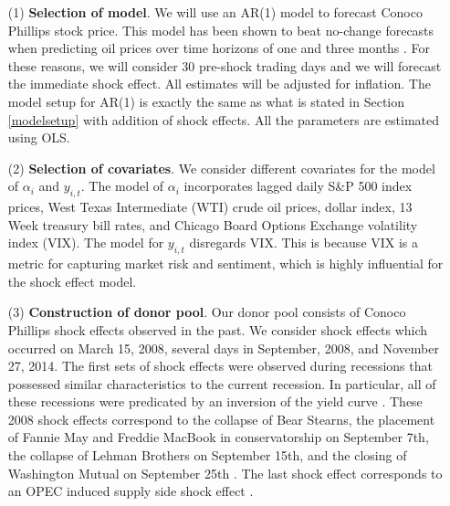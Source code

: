 \documentclass[11pt,3p,review,authoryear]{elsarticle}
\theoremstyle{definition}
\begin{document}
\begin{enumerate}
\item[(1)] {\bf Selection of model}. We will use an AR(1) model to forecast Conoco Phillips stock price. This model has been shown to beat no-change forecasts when predicting oil prices over time horizons of one and three months \citep{alquist2013forecasting}.  For these reasons, we will consider 30 pre-shock trading days and we will forecast the immediate shock effect. All estimates will be adjusted for inflation. The model setup for AR(1) is exactly the same as what is stated in Section \ref{modelsetup} with addition of shock effects. All the parameters are estimated using OLS.
\item[(2)] {\bf Selection of covariates}. We consider different covariates for the model of $\alpha_i$ and $y_{i, t}$. The model of $\alpha_i$ incorporates lagged daily S\&P 500 index prices, West Texas Intermediate (WTI) crude oil prices, dollar index, 13 Week treasury bill rates, and Chicago Board Options Exchange volatility index (VIX). The model for $y_{i,t}$ disregards VIX. This is because VIX is a metric for capturing market risk and sentiment, which is highly influential for the shock effect model.
\item[(3)] {\bf Construction of donor pool}. Our donor pool consists of Conoco Phillips shock effects observed in the past. We consider shock effects which occurred on March 15, 2008, several days in September, 2008, and November 27, 2014. The first sets of shock effects were observed during recessions that possessed similar characteristics to the current recession. In particular, all of these recessions were predicated by an inversion of the yield curve \citep{bauer2018economic}. These 2008 shock effects correspond to the collapse of Bear Stearns, the placement of Fannie May and Freddie MacBook in conservatorship on September 7th, the collapse of Lehman Brothers on September 15th, and the closing of Washington Mutual on September 25th \citep{shorter2008bear, ewing2013volatility, dwyer2009financial, longstaff2010subprime}. The last shock effect corresponds to an OPEC induced supply side shock effect \citep{huppmann2015opec}. 
\end{enumerate}
\end{document}
